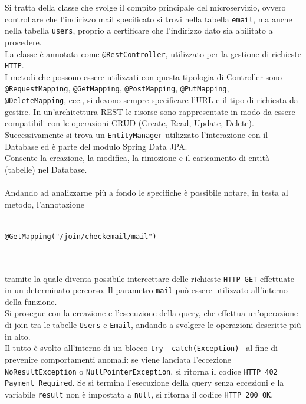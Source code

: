 Si tratta della classe che svolge il compito principale del microservizio, ovvero controllare che l'indirizzo mail specificato si trovi nella 
tabella \texttt{email}, ma anche nella tabella \texttt{users}, proprio a certificare che l'indirizzo dato sia abilitato a procedere.\\
La classe è annotata come \texttt{@RestController}, utilizzato per la gestione di richieste \texttt{HTTP}.\\
I metodi che possono essere utilizzati con questa tipologia di Controller sono \texttt{@RequestMapping}, \texttt{@GetMapping}, 
\texttt{@PostMapping}, \texttt{@PutMapping},\\ \texttt{@DeleteMapping}, ecc., si devono sempre specificare l'URL e il tipo di richiesta da gestire.
In un'architettura REST le risorse sono rappresentate in modo da essere compatibili con le operazioni CRUD (Create, Read, Update, Delete).\\
Successivamente si trova un \texttt{EntityManager} utilizzato l'interazione con il Database ed è parte del modulo Spring Data JPA.\\
Consente la creazione, la modifica, la rimozione e il caricamento di entità (tabelle) nel Database. \\ \\
Andando ad analizzarne più a fondo le specifiche è possibile notare, in testa al metodo, l'annotazione\\ \\
\centerline{\texttt{@GetMapping("/join/checkemail/{mail}")}} \\ \\
tramite la quale diventa possibile intercettare delle richieste \texttt{HTTP GET} effettuate in un determinato percorso. Il parametro \texttt{{mail}} può essere
utilizzato all'interno della funzione.\\
Si prosegue con la creazione e l'esecuzione della query, che effettua un'operazione di join tra le tabelle \texttt{Users} e \texttt{Email}, andando a 
svolgere le operazioni descritte più in alto.\\
Il tutto è svolto all'interno di un blocco \texttt{try{ } catch(Exception){ }} al fine di prevenire comportamenti anomali: se viene lanciata l'eccezione\\
\texttt{NoResultException} o \texttt{NullPointerException}, si ritorna il codice \texttt{HTTP 402 Payment Required}.
Se si termina l'esecuzione della query senza eccezioni e la variabile \texttt{result} non è impostata a \texttt{null}, si ritorna il codice \texttt{HTTP 200 OK}.

